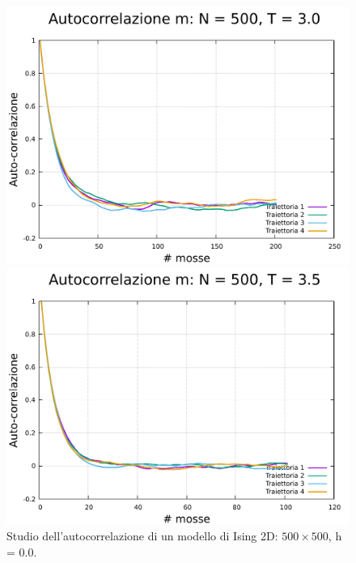 \begin{figure}[H]
    \begin{minipage}{0.45\textwidth}  
      \centering
      \includegraphics[page=1, width=\textwidth]{Immagini/simIsing2D/metro/tcorr/auto_500_3.0.pdf}
      \caption{$T\,=\,3.0$}
    \end{minipage}\hfill
    \begin{minipage}{0.45\textwidth}  
      \centering
      \includegraphics[page=1, width=\textwidth]{Immagini/simIsing2D/metro/tcorr/auto_500_3.5.pdf}
      \caption{$T\,=\,3.5$}
    \end{minipage}
    \caption{Studio dell'autocorrelazione di un modello di Ising 2D: $500 \times 500$, h = 0.0.}
\end{figure}

